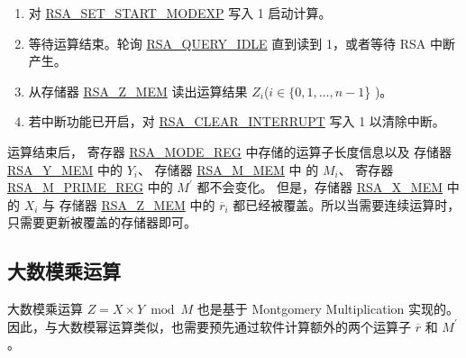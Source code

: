 \documentclass[main\_\_CN.tex]{subfiles}
\begin{document}
\begin{enumerate}
        只需要根据运算子长度，将各个运算子中有效的数据写入存储器，没有使用到的存储器可以是任意值。

    \item 对 \hyperref[fielddesc:RSASETSTARTMODEXP]{RSA\_SET\_START\_MODEXP} 写入 1 启动计算。

    \item 等待运算结束。轮询 \hyperref[fielddesc:RSAQUERYIDLE]{RSA\_QUERY\_IDLE} 直到读到 1，或者等待 RSA 中断产生。
        
    \item 从存储器 \hyperref[regdesc:RSAmemory]{RSA\_Z\_MEM} 读出运算结果 \begin{math}Z_{i}\end{math}(\begin{math}i \in \{ 0, 1, \dots, n-1 \end{math}\} )。

    \item 若中断功能已开启，对 \hyperref[fielddesc:RSACLEARINTERRUPT]{RSA\_CLEAR\_INTERRUPT} 写入 1 以清除中断。

\end{enumerate}

运算结束后，
寄存器 \hyperref[regdesc:RSAMODEREG]{RSA\_MODE\_REG} 中存储的运算子长度信息以及
存储器 \hyperref[regdesc:RSAmemory]{RSA\_Y\_MEM} 中的 \begin{math}Y_{i}\end{math}、
存储器 \hyperref[regdesc:RSAmemory]{RSA\_M\_MEM} 中 的 \begin{math}M_{i}\end{math}、
寄存器 \hyperref[regdesc:RSAMPRIMEREG]{RSA\_M\_PRIME\_REG} 中的 \begin{math}M^{\prime}\end{math} 都不会变化。
但是，存储器 \hyperref[regdesc:RSAmemory]{RSA\_X\_MEM} 中的 \begin{math}X_{i}\end{math} 与
存储器 \hyperref[regdesc:RSAmemory]{RSA\_Z\_MEM} 中的 \begin{math}\overline{r}_{i}\end{math} 
都已经被覆盖。所以当需要连续运算时，只需要更新被覆盖的存储器即可。


\subsection{大数模乘运算}

大数模乘运算 \begin{math}Z = X \times Y \bmod M\end{math} 也是基于 Montgomery Multiplication 实现的。因此，与大数模幂运算类似，也需要预先通过软件计算额外的两个运算子
\begin{math}\overline{r}\end{math} 和 
\begin{math}M^{\prime}\end{math}。
\end{document}
